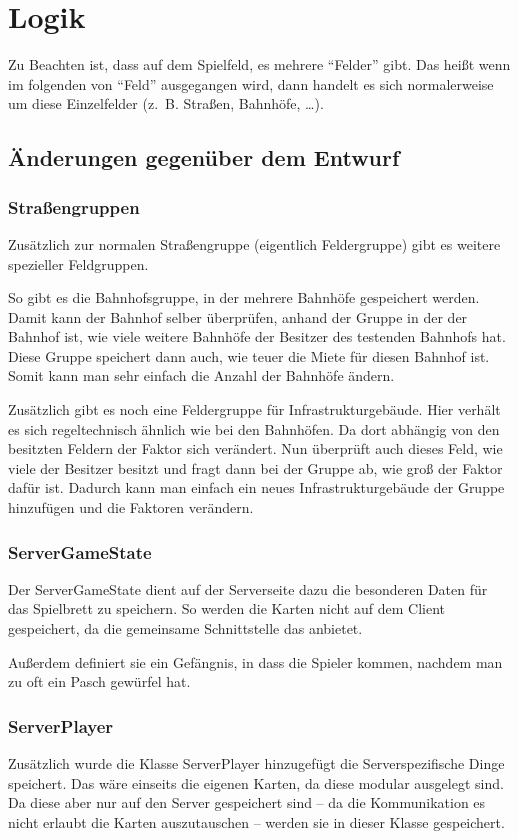 \documentclass[a4paper,10pt]{article}
\begin{document}
\section{Logik}
Zu Beachten ist, dass auf dem Spielfeld, es mehrere ``Felder'' gibt. Das heißt wenn im folgenden von ``Feld'' ausgegangen wird, dann handelt es sich normalerweise um diese Einzelfelder (z.~B. Straßen, Bahnhöfe, \dots).
\subsection {Änderungen gegenüber dem Entwurf}
\subsubsection{Straßengruppen}
Zusätzlich zur normalen Straßengruppe (eigentlich Feldergruppe) gibt es weitere spezieller Feldgruppen.

So gibt es die Bahnhofsgruppe, in der mehrere Bahnhöfe gespeichert werden. Damit kann der Bahnhof selber überprüfen, anhand der Gruppe in der der Bahnhof ist, wie viele weitere Bahnhöfe der Besitzer des testenden Bahnhofs hat. Diese Gruppe speichert dann auch, wie teuer die Miete für diesen Bahnhof ist. Somit kann man sehr einfach die Anzahl der Bahnhöfe ändern.

Zusätzlich gibt es noch eine Feldergruppe für Infrastrukturgebäude. Hier verhält es sich regeltechnisch ähnlich wie bei den Bahnhöfen. Da dort abhängig von den besitzten Feldern der Faktor sich verändert. Nun überprüft auch dieses Feld, wie viele der Besitzer besitzt und fragt dann bei der Gruppe ab, wie groß der Faktor dafür ist. Dadurch kann man einfach ein neues Infrastrukturgebäude der Gruppe hinzufügen und die Faktoren verändern.
\subsubsection{ServerGameState}
Der ServerGameState dient auf der Serverseite dazu die besonderen Daten für das Spielbrett zu speichern. So werden die Karten nicht auf dem Client gespeichert, da die gemeinsame Schnittstelle das anbietet.

Außerdem definiert sie ein Gefängnis, in dass die Spieler kommen, nachdem man zu oft ein Pasch gewürfel hat.

\subsubsection{ServerPlayer}
Zusätzlich wurde die Klasse ServerPlayer hinzugefügt die Serverspezifische Dinge speichert. Das wäre einseits die eigenen Karten, da diese modular ausgelegt sind. Da diese aber nur auf den Server gespeichert sind -- da die Kommunikation es nicht erlaubt die Karten auszutauschen -- werden sie in dieser Klasse gespeichert.
\end{document}
